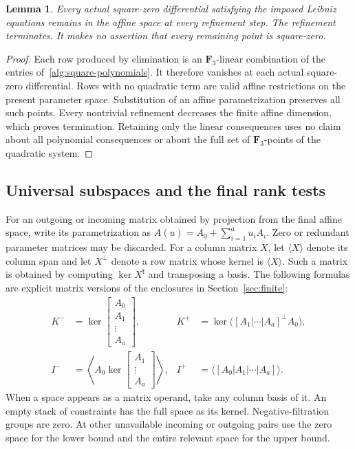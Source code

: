 \documentclass[11pt]{article}
\newtheorem{lemma}[theorem]{Lemma}
\theoremstyle{definition}
\theoremstyle{remark}
\numberwithin{equation}{section}
\begin{document}
\begin{lemma}\label{alg:square-soundness}
Every actual square-zero differential satisfying the imposed Leibniz
equations remains in the affine space at every refinement step.
The refinement terminates.  It makes no assertion that every remaining
point is square-zero.
\end{lemma}

\begin{proof}
Each row produced by elimination is an $\mathbf F_3$-linear combination of
the entries of~\eqref{alg:square-polynomials}.  It therefore vanishes
at each actual square-zero differential.  Rows with no quadratic term
are valid affine restrictions on the present parameter space.
Substitution of an affine parametrization preserves all such points.
Every nontrivial refinement decreases the finite affine dimension,
which proves termination.  Retaining only the linear consequences
uses no claim about all polynomial consequences or about the full set
of $\mathbf F_3$-points of the quadratic system.
\end{proof}

\subsection{Universal subspaces and the final rank tests}

For an outgoing or incoming matrix obtained by projection from the final
affine space, write its parametrization as
$A(u)=A_0+\sum_{i=1}^a u_iA_i$.  Zero or redundant parameter matrices
may be discarded.  For a column matrix $X$, let $\langle X\rangle$
denote its column span and let $X^\perp$ denote a row matrix whose
kernel is $\langle X\rangle$.  Such a matrix is obtained by computing
$\ker X^{\mathsf t}$ and transposing a basis.  The following formulas
are explicit matrix versions of the enclosures in
Section~\ref{sec:finite}:
\begin{align}
 K^-&=\ker\begin{bmatrix}A_0\\A_1\\\vdots\\A_a\end{bmatrix},
 &K^+&=\ker\bigl([A_1|\cdots|A_a]^\perp A_0\bigr),
 \label{alg:kernel-enclosures}\\
 I^-&=\left\langle A_0\ker\begin{bmatrix}A_1\\\vdots\\A_a\end{bmatrix}
                              \right\rangle,
 &I^+&=\langle[A_0|A_1|\cdots|A_a]\rangle.
 \label{alg:image-enclosures}
\end{align}
When a space appears as a matrix operand, take any column basis of it.
An empty stack of constraints has the full space as its kernel.
Negative-filtration groups are zero.  At other unavailable incoming
or outgoing pairs use the zero space for the lower bound and the
entire relevant space for the upper bound.
\end{document}
